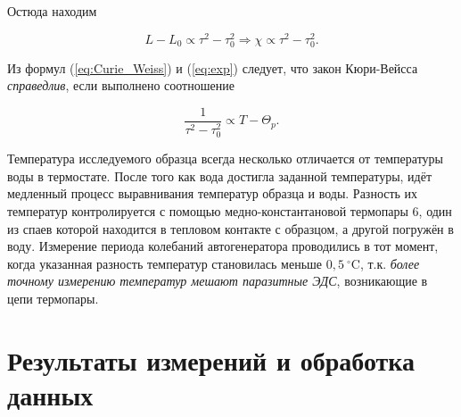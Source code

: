 \documentclass[a4paper, 12pt]{article}
\begin{document}
    Остюда находим

    \begin{equation}
        L - L_0 \propto \tau^2 - \tau_0^2 \Rightarrow \chi \propto \tau^2 - \tau_0^2.
        \label{eq:exp}
    \end{equation}
    
    Из формул (\ref{eq:Curie_Weiss}) и (\ref{eq:exp}) следует, что закон Кюри-Вейсса \textit{справедлив}, если выполнено соотношение
    
    \begin{equation}
        \frac{1}{\tau^2 - \tau_0^2} \propto T - \Theta_p.
    \end{equation}

    Температура исследуемого образца всегда несколько отличается от температуры воды в термостате. После того как вода достигла заданной температуры, идёт медленный процесс выравнивания температур образца и воды. Разность их температур контролируется с помощью медно-константановой термопары $6$, один из спаев которой находится в тепловом контакте с образцом, а другой погружён в воду. Измерение периода колебаний автогенератора проводились в тот момент, когда указанная разность температур становилась меньше $0,5 \: ^\circ$C, т.к. \textit{более точному измерению температур мешают паразитные ЭДС}, возникающие в цепи термопары.
	
    \section{Результаты измерений и обработка данных}
\end{document}
